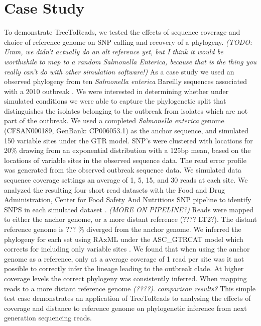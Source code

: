 \section{Case Study}
To demonstrate TreeToReads, we tested the effects of sequence coverage and choice of reference genome on SNP calling and recovery of a phylogeny.
\emph{(TODO: Umm, we didn't actually do an alt reference yet, but I think it would be worthwhile to map to a random Salmonella Enterica, because that is the thing you really can't do with other simulation software!)}
As a case study we used an observed phylogeny from ten \emph{Salmonella enterica} Bareilly sequences associated with a 2010 outbreak \citep{hoffmann_tracing_2015}.
We were interested in determining whether under simulated conditions we were able to capture the phylogenetic split that distinguishes the isolates belonging to the outbreak from isolates which are not part of the outbreak.
We used a completed \emph{Salmonella enterica} genome (CFSAN000189, GenBank: CP006053.1) as the anchor sequence, and simulated 150 variable sites under the GTR model.
SNP's were clustered with locations for 20\% drawing from an exponential distribution with a 125bp mean, based on the locations of variable sites in the observed sequence data.
The read error profile was generated from the observed outbreak sequence data.
We simulated data sequence coverage settings an average of 1, 5, 15, and 30 reads at each site. 
We analyzed the resulting four short read datasets with the Food and Drug Administration, Center for Food Safety And Nutritions SNP pipeline to identify SNPS in each simulated dataset \citep{davis_cfsan_2015}.
\emph{(MORE ON PIPELINE?)}
Reads were mapped to either the anchor genome, or a more distant reference (???? LT2?).
The distant reference genome is ??? \% diverged from the anchor genome.
We inferred the phylogeny for each set using RAxML under the ASC\_GTRCAT model which corrects for including only variable sites  \citep{stamatakis_raxml_2014} .
We found that when using the anchor genome as a reference, only at a average coverage of 1 read per site was it not possible to correctly infer the lineage leading to the outbreak clade.
At higher coverage levels the correct phylogeny was consistently inferred.
When mapping reads to a more distant reference genome \emph{(????)}.
\emph{comparison results?}
This simple test case demonstrates an application of TreeToReads to analysing the effects of coverage and distance
to reference genome on phylogenetic inference from next generation sequencing reads.

